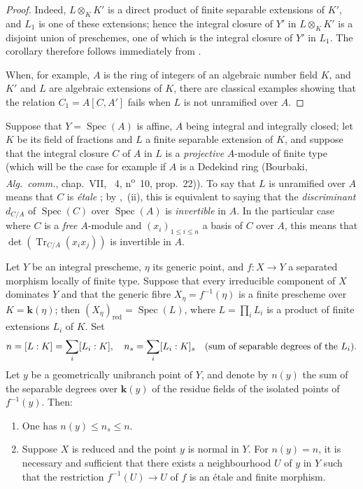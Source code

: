 \begin{proof}
Indeed, $L\otimes_{K}K'$ is a direct product of finite separable extensions of $K'$, and $L_1$
is one of these extensions; hence the integral closure of $Y'$ in $L\otimes_{K}K'$ is a disjoint union of preschemes, one of which is the integral closure of $Y'$ in $L_1$.
The corollary therefore follows immediately from .

When, for example, $A$ is the ring of integers of an algebraic number field $K$, and $K'$ and $L$ are algebraic extensions of $K$, there are classical examples showing that the relation $C_1=A[C,A']$ fails when $L$ is not unramified over $A$.
\end{proof}

\begin{env}[18.10.15]
\label{IV.18.10.15}
Suppose that $Y=\operatorname{Spec}(A)$ is affine, $A$ being integral and integrally closed; let $K$ be its field of fractions and $L$ a finite separable extension of $K$, and suppose that the integral closure $C$ of $A$ in $L$ is a \emph{projective} $A$-module of finite type (which will be the case for example if $A$ is a Dedekind ring (Bourbaki, \emph{Alg.\ comm.}, chap.~VII, \textsection~4, n\textsuperscript{o}~10, prop.~22)).
To say that $L$ is unramified over $A$ means that $C$ is \emph{\'etale} ; by ,~(ii), this is equivalent to saying that the \emph{discriminant} $d_{C/A}$ of $\operatorname{Spec}(C)$ over $\operatorname{Spec}(A)$ is \emph{invertible} in $A$.
In the particular case where $C$ is a \emph{free} $A$-module and $(x_i)_{1\leq i\leq n}$ a basis of $C$ over $A$, this means that $\det(\operatorname{Tr}_{C/A}(x_ix_j))$ is invertible in $A$.
\end{env}

\begin{theorem}[18.10.16]
\label{IV.18.10.16}
Let $Y$ be an integral prescheme, $\eta$ its generic point, and $f:X\to Y$ a separated morphism locally of finite type.
Suppose that every irreducible component of $X$ dominates $Y$ and that the generic fibre $X_\eta=f^{-1}(\eta)$ is a finite prescheme over $K=\boldsymbol{k}(\eta)$; then $(X_\eta)_{\mathrm{red}}=\operatorname{Spec}(L)$, where $L=\prod_iL_i$ is a product of finite extensions $L_i$ of $K$.
Set
\[
  n=[L:K]=\sum_i[L_i:K],\quad n_s=\sum_i[L_i:K]_s\quad\text{\textup{(sum of separable degrees of the $L_i$)}}.
\]
Let $y$ be a \textup{geometrically unibranch} point of $Y$, and denote by $n(y)$ the sum of the separable degrees over $\boldsymbol{k}(y)$ of the residue fields of the \textup{isolated} points of $f^{-1}(y)$.
Then:
\begin{enumerate}[label=\textup{(\roman*)}]
  \item One has $n(y)\leq n_s\leq n$.
  \item Suppose $X$ is reduced and the point $y$ is normal in $Y$.
For $n(y)=n$, it is necessary and sufficient that there exists a neighbourhood $U$ of $y$ in $Y$ such that the restriction $f^{-1}(U)\to U$ of $f$ is an \'etale and finite morphism.
\end{enumerate}
\end{theorem}

